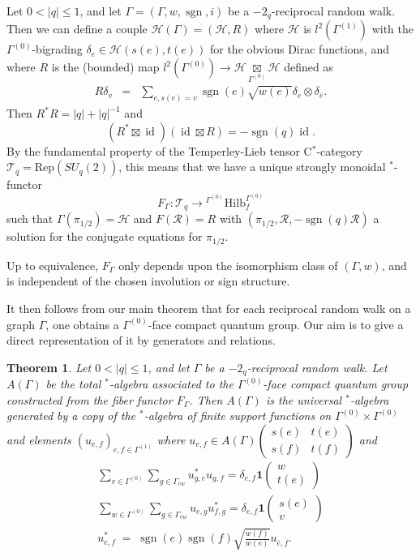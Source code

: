 \documentclass[12pt]{article}
\theoremstyle{change}
\DeclareMathOperator{\id}{id}
\DeclareMathOperator{\sgn}{\mathrm{sgn}}
\newcommand{\Hsp}{\mathscr{H}}
\newcommand{\Hilb}{\mathrm{Hilb}}
\newcommand{\Rep}{\mathrm{Rep}}
\newcommand{\Grru}[2]{\begin{pmatrix} #1 \\ #2\end{pmatrix}}
\newtheorem{Theorem}{Theorem}[section]
\theoremstyle{definition}
\numberwithin{equation}{section}
\begin{document}
Let $0<|q|\leq 1$, and let $\Gamma = (\Gamma,w,\sgn,i)$ be a $-2_q$-reciprocal random walk. Then we can define a couple $\Hsp(\Gamma) = (\Hsp,R)$ where $\Hsp$ is $l^2(\Gamma^{(1)})$ with the $\Gamma^{(0)}$-bigrading $\delta_e \in \Hsp(s(e),t(e))$ for the obvious Dirac functions, and where $R$ is the (bounded) map $l^2(\Gamma^{(0)})\rightarrow \Hsp\underset{\Gamma^{(0)}}{\boxtimes} \Hsp$ defined as \begin{eqnarray*} R\delta_v &=& \sum_{e,s(e) = v} \sgn(e)\sqrt{w(e)}\delta_e \otimes \delta_{\bar{e}}.\end{eqnarray*} Then $R^*R = |q|+|q|^{-1}$ and \[(R^*\boxtimes \id)(\id\boxtimes R) = -\sgn(q)\id.\] By the fundamental property of the Temperley-Lieb tensor C$^*$-category $\mathcal{T}_q = \Rep(SU_q(2))$, this means that we have a unique strongly monoidal $^*$-functor
\[F_{\Gamma}:\mathcal{T}_q \rightarrow {}^{\Gamma^{(0)}}\Hilb_f^{\Gamma^{(0)}}\] such that $\Gamma(\pi_{1/2}) = \Hsp$ and $F(\mathscr{R}) = R$ with $(\pi_{1/2},\mathscr{R},-\sgn(q)\mathscr{R})$ a solution for the conjugate equations for $\pi_{1/2}$. 

Up to equivalence, $F_{\Gamma}$ only depends upon the isomorphism class of $(\Gamma,w)$, and is independent of the chosen involution or sign structure.

It then follows from our main theorem that for each reciprocal random walk on a graph $\Gamma$, one obtains a $\Gamma^{(0)}$-face compact quantum group. Our aim is to give a direct representation of it by generators and relations.

\begin{Theorem}\label{TheoGenRel} Let $0<|q|\leq 1$, and let $\Gamma$ be a $-2_q$-reciprocal random walk. Let $A(\Gamma)$ be the total $^*$-algebra associated to the $\Gamma^{(0)}$-face compact quantum group constructed from the fiber functor $F_{\Gamma}$. Then $A(\Gamma)$ is the universal $^*$-algebra generated by a copy of the $^*$-algebra of finite support functions on $\Gamma^{(0)}\times \Gamma^{(0)}$ and elements $(u_{e,f})_{e,f\in \Gamma^{(1)}}$ where $u_{e,f}\in A(\Gamma)\begin{pmatrix} s(e) & t(e)\\ s(f)&t(f)\end{pmatrix}$ and 
\begin{eqnarray*} 
\sum_{v\in \Gamma^{(0)}}\sum_{g\in \Gamma_{vw}} u_{g,e}^*u_{g,f} = \delta_{e,f}\mathbf{1}\Grru{w}{t(e)}\\
\sum_{w\in \Gamma^{(0)}} \sum_{g\in \Gamma_{vw}} u_{e,g}u_{f,g}^* = \delta_{e,f} \mathbf{1}\Grru{s(e)}{v}\\ 
u_{e,f}^* \;=\; \sgn(e)\sgn(f)\sqrt{\frac{w(f)}{w(e)}} u_{\bar{e},\bar{f}}.
\end{eqnarray*} 
\end{Theorem} 
\end{document}
